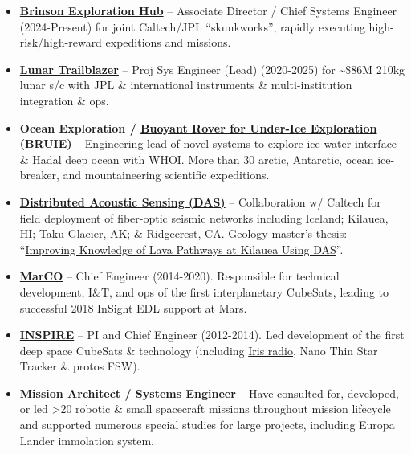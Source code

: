 \documentclass[11pt,letterpaper]{article}
\begin{document}
\begin{itemize}
\item \textbf{\href{https://www.brinsonhub.caltech.edu/team/andy-klesh?back_url=/team}{Brinson Exploration Hub}} – Associate Director / Chief Systems Engineer (2024-Present) for joint Caltech/JPL “skunkworks”, rapidly executing high-risk/high-reward expeditions and missions.
\item \textbf{\href{https://science.nasa.gov/mission/lunar-trailblazer/}{Lunar Trailblazer}} – Proj Sys Engineer (Lead) (2020-2025) for \textasciitilde{}\$86M 210kg lunar s/c with JPL \& international instruments \& multi-institution integration \& ops.
\item \textbf{Ocean Exploration / \href{https://www.jpl.nasa.gov/robotics-at-jpl/bruie/}{Buoyant Rover for Under-Ice Exploration (BRUIE)}} – Engineering lead of novel systems to explore ice-water interface \& Hadal deep ocean with WHOI. More than 30 arctic, Antarctic, ocean ice-breaker, and mountaineering scientific expeditions.
\item \textbf{\href{https://www.caltech.edu/about/news/fiber-sensing-technology-can-provide-early-warning-for-volcanic-eruptions}{Distributed Acoustic Sensing (DAS)}} – Collaboration w/ Caltech for field deployment of fiber-optic seismic networks including Iceland; Kilauea, HI; Taku Glacier, AK; \& Ridgecrest, CA. Geology master’s thesis: “\href{https://scholarworks.calstate.edu/concern/theses/1544bw88k}{Improving Knowledge of Lava Pathways at Kilauea Using DAS}”.
\item \textbf{\href{https://www.jpl.nasa.gov/missions/mars-cube-one-marco/}{MarCO}} – Chief Engineer (2014-2020). Responsible for technical development, I\&T, and ops of the first interplanetary CubeSats, leading to successful 2018 InSight EDL support at Mars.
\item \textbf{\href{https://www.jpl.nasa.gov/missions/interplanetary-nano-spacecraft-pathfinder-in-relevant-environment-inspire/}{INSPIRE}} – PI and Chief Engineer (2012-2014). Led development of the first deep space CubeSats \& technology (including \href{https://en.wikipedia.org/wiki/Iris_%28transponder%29}{Iris radio}, Nano Thin Star Tracker \& protos FSW).
\item \textbf{Mission Architect / Systems Engineer} – Have consulted for, developed, or led >20 robotic \& small spacecraft missions throughout mission lifecycle and supported numerous special studies for large projects, including Europa Lander immolation system.
\end{itemize}
\end{document}
